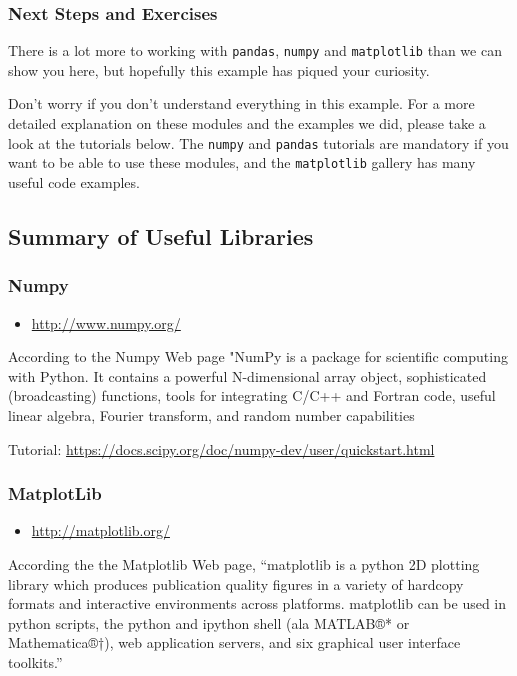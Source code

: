 \subsubsection{Next Steps and Exercises}\label{next-steps-and-exercises}

There is a lot more to working with \texttt{pandas}, \texttt{numpy} and
\texttt{matplotlib} than we can show you here, but hopefully this
example has piqued your curiosity.

Don't worry if you don't understand everything in this example. For a
more detailed explanation on these modules and the examples we did,
please take a look at the tutorials below. The \texttt{numpy} and
\texttt{pandas} tutorials are mandatory if you want to be able to use
these modules, and the \texttt{matplotlib} gallery has many useful code
examples.

\subsection{Summary of Useful
Libraries}\label{summary-of-useful-libraries}

\subsubsection{Numpy}\label{numpy}

\begin{itemize}
\tightlist
\item
  \url{http://www.numpy.org/}
\end{itemize}

According to the Numpy Web page "NumPy is a package for scientific
computing with Python. It contains a powerful N-dimensional array
object, sophisticated (broadcasting) functions, tools for integrating
C/C++ and Fortran code, useful linear algebra, Fourier transform, and
random number capabilities

Tutorial:
\url{https://docs.scipy.org/doc/numpy-dev/user/quickstart.html}

\subsubsection{MatplotLib}\label{matplotlib}

\begin{itemize}
\tightlist
\item
  \url{http://matplotlib.org/}
\end{itemize}

According the the Matplotlib Web page, ``matplotlib is a python 2D
plotting library which produces publication quality figures in a variety
of hardcopy formats and interactive environments across platforms.
matplotlib can be used in python scripts, the python and ipython shell
(ala MATLAB®* or Mathematica®†), web application servers, and six
graphical user interface toolkits.''

